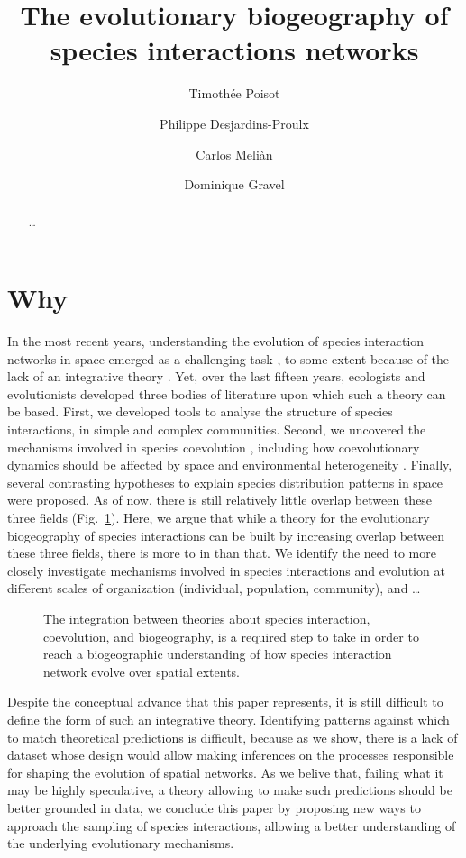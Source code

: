 \documentclass[11pt,oneside]{article}
\title{The evolutionary biogeography of species interactions networks}
\author{Timoth\'ee Poisot \and Philippe Desjardins-Proulx \and Carlos Meli\`an \and Dominique Gravel}
\begin{document}
\maketitle
\begin{abstract}
	\ldots 
\end{abstract}
\onehalfspacing\clearpage


\section{Why}

In the most recent years, understanding the evolution of species interaction
networks in space emerged as a challenging task \parencite{Pillai2011}, to some
extent because of the lack of an integrative theory \parencite{Urban2008}. Yet,
over the last fifteen years, ecologists and evolutionists developed three bodies
of literature upon which such a theory can be based. First, we developed tools
to analyse the structure of species interactions, in simple and complex
communities. Second, we uncovered the mechanisms involved in species coevolution
\parencite{Thompson1994a}, including how coevolutionary dynamics should be
affected by space and environmental heterogeneity \parencite{Thompson2005}.
Finally, several contrasting hypotheses to explain species distribution patterns
in space were proposed.
As of now, there is still relatively little overlap between these three fields
(Fig.~\ref{f:venn}). Here, we argue that while a theory for the evolutionary
biogeography of species interactions can be built by increasing overlap between
these three fields, there is more to in than that. We identify the need to more
closely investigate mechanisms involved in species interactions and evolution at
different scales of organization (individual, population, community), and \ldots

\begin{figure}[htbp]
   \centering
   
   \caption{The integration between theories about species interaction, coevolution, and biogeography,
    is a required step to take in order to reach a biogeographic understanding of how species interaction network evolve over
    spatial extents.}
   \label{f:venn}
\end{figure}

Despite the conceptual advance that this paper represents, it is still difficult
to define the form of such an integrative theory. Identifying patterns
against which to match theoretical predictions is difficult, because as we show,
there is a lack of dataset whose design would allow making inferences on the
processes responsible for shaping the evolution of spatial networks. As we
belive that, failing what it may be highly speculative, a theory allowing to
make such predictions should be better grounded in data, we conclude this paper
by proposing new ways to approach the sampling of species interactions, allowing
a better understanding of the underlying evolutionary mechanisms.
\end{document}
